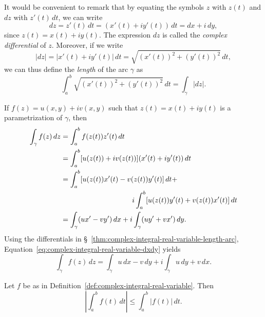 \begin{sectionthm}
    \label{thm:complex-integral-real-variable-length-arc}
    It would be convenient to remark that by equating the symbols \(z\) with \(z(t)\) and \(dz\) with \(z'(t) \, dt\), we can write
    \[
        dz = z'(t) \, dt = (x'(t) + iy'(t)) \, dt = dx + i \, dy,
    \]
    since \(z(t) = x(t) + iy(t)\). The expression \(dz\) is called the \emph{complex differential} of \(z\). Moreover, if we write
    \[
        |dz| = |x'(t) + iy'(t)| \, dt = \sqrt{(x'(t))^2 + (y'(t))^2} \, dt,
    \]
    we can thus define the \emph{length} of the arc \(\gamma\) as
    \[
        \int_a^b \sqrt{(x'(t))^2 + (y'(t))^2} \, dt = \int_\gamma |dz|.
    \]
\end{sectionthm}

\begin{sectionthm}
    \label{thm:complex-integral-real-variable-dxdy}
    If \(f(z) = u(x, y) + iv(x, y)\) such that \(z(t) = x(t) + iy(t)\) is a parametrization of \(\gamma\), then
    \begin{align}
        \int_\gamma f(z) \, dz &= \int_a^b f(z(t)) z'(t) \, dt \nonumber\\
        &= \int_a^b [u(z(t)) + iv(z(t))] (x'(t) + iy'(t)) \, dt \nonumber\\
        &= \int_a^b [u(z(t))x'(t) - v(z(t))y'(t)] \, dt + \nonumber\\
        &\hphantom{{}={PLACEHOLDER}} i \int_a^b [u(z(t))y'(t) + v(z(t))x'(t)] \, dt\nonumber\\
        &= \int_\gamma (ux' - vy') \, dx + i \int_\gamma (uy' + vx') \, dy.\label{eq:complex-integral-real-variable-dxdy}
    \end{align}
    Using the differentials in \S~\ref{thm:complex-integral-real-variable-length-arc}, Equation~\eqref{eq:complex-integral-real-variable-dxdy} yields
    \[
        \int_\gamma f(z) \, dz = \int_\gamma u \, dx - v \, dy + i \int_\gamma u \, dy + v \, dx.
    \]
\end{sectionthm}


\begin{theorem}
    Let \(f\) be as in Definition~\ref{def:complex-integral-real-variable}. Then
    \[
        \left| \int_a^b f(t) \, dt \right| \leq \int_a^b |f(t)| \, dt.
    \]
    \label{thm:modulus-integral-inequality}
\end{theorem}

